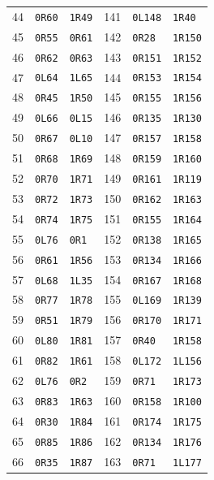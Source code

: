 \begin{longtable}{@{}rll@{\hspace{24pt}}rll@{}}
44 & \texttt{0R60} & \texttt{1R49} & 141 & \texttt{0L148} & \texttt{1R40}\\
45 & \texttt{0R55} & \texttt{0R61} & 142 & \texttt{0R28} & \texttt{1R150}\\
46 & \texttt{0R62} & \texttt{0R63} & 143 & \texttt{0R151} & \texttt{1R152}\\
47 & \texttt{0L64} & \texttt{1L65} & 144 & \texttt{0R153} & \texttt{1R154}\\
48 & \texttt{0R45} & \texttt{1R50} & 145 & \texttt{0R155} & \texttt{1R156}\\
49 & \texttt{0L66} & \texttt{0L15} & 146 & \texttt{0R135} & \texttt{1R130}\\
50 & \texttt{0R67} & \texttt{0L10} & 147 & \texttt{0R157} & \texttt{1R158}\\
51 & \texttt{0R68} & \texttt{1R69} & 148 & \texttt{0R159} & \texttt{1R160}\\
52 & \texttt{0R70} & \texttt{1R71} & 149 & \texttt{0R161} & \texttt{1R119}\\
53 & \texttt{0R72} & \texttt{1R73} & 150 & \texttt{0R162} & \texttt{1R163}\\
54 & \texttt{0R74} & \texttt{1R75} & 151 & \texttt{0R155} & \texttt{1R164}\\
55 & \texttt{0L76} & \texttt{0R1} & 152 & \texttt{0R138} & \texttt{1R165}\\
56 & \texttt{0R61} & \texttt{1R56} & 153 & \texttt{0R134} & \texttt{1R166}\\
57 & \texttt{0L68} & \texttt{1L35} & 154 & \texttt{0R167} & \texttt{1R168}\\
58 & \texttt{0R77} & \texttt{1R78} & 155 & \texttt{0L169} & \texttt{1R139}\\
59 & \texttt{0R51} & \texttt{1R79} & 156 & \texttt{0R170} & \texttt{1R171}\\
60 & \texttt{0L80} & \texttt{1R81} & 157 & \texttt{0R40} & \texttt{1R158}\\
61 & \texttt{0R82} & \texttt{1R61} & 158 & \texttt{0L172} & \texttt{1L156}\\
62 & \texttt{0L76} & \texttt{0R2} & 159 & \texttt{0R71} & \texttt{1R173}\\
63 & \texttt{0R83} & \texttt{1R63} & 160 & \texttt{0R158} & \texttt{1R100}\\
64 & \texttt{0R30} & \texttt{1R84} & 161 & \texttt{0R174} & \texttt{1R175}\\
65 & \texttt{0R85} & \texttt{1R86} & 162 & \texttt{0R134} & \texttt{1R176}\\
66 & \texttt{0R35} & \texttt{1R87} & 163 & \texttt{0R71} & \texttt{1L177}\\

\end{longtable}

